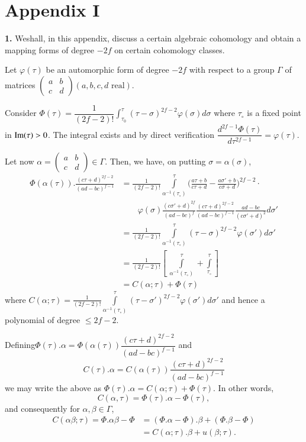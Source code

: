 \backmatter
\chapter{Appendix I}

\textbf{1.} We\pageoriginale shall, in this appendix, discuss a
certain algebraic 
cohomology and obtain a mapping forms of degree $-2f$ on certain
cohomology classes.


Let $\varphi(\tau)$ be an automorphic form of degree $-2f$ with
respect to a group $\Gamma$ of matrices $\begin{pmatrix}
  a&b\\c&d\end{pmatrix} (a,b,c,d \text{ real})$. 

Consider $\Phi (\tau)=\dfrac{1}{(2f-2)!}\int ^\tau
_{\tau_0}(\tau-\sigma)^{2f-2}\varphi (\sigma)d \sigma$ where $\tau_
\circ$ is a fixed point in $\operatorname{Im} (\tau)>0$. The integral exists and by
direct verification $\dfrac{d^{2f-1}\Phi (\tau)}{d\tau ^{2f-1}}=\varphi
(\tau)$. 

Let now $\alpha=\begin{pmatrix} a&b\\c&d\end{pmatrix}\in
\Gamma$. Then, we have, on putting $\sigma=\alpha (\sigma)$, 
\begin{align*}
  \Phi (\alpha(\tau)). \frac{(c\tau
    +d)^{2f-2}}{(ad-bc)^{f-1}}&=\frac{1}{(2f-2)!} \int
  \limits^\tau_{\alpha^{-1}(\tau_ \circ)}\bigg (\frac{a \tau+b}{c \tau
    +d}-\frac{a \sigma' +b}{c \sigma +d} \bigg )^{2f-2}\cdot \\ 
  & \qquad \varphi
  (\sigma)\frac{(c \sigma' +d)^{2f}}{(ad-bc)^f} \frac{(c \tau
    +d)^{2f-2}}{(ad-bc)^{f-1}} \frac{ad-bc}{(c \sigma' +d)^2}d
  \sigma'\\ 
  &=\frac{1}{(2f-2)!}\int \limits^\tau_{\alpha^{-1}(\tau_ \circ)}
  (\tau -\sigma)^{2f-2}\varphi (\sigma')d \sigma'\\ 
  &=\frac{1}{(2f-2)!}\left[~\int \limits^\tau_{\alpha^{-1}(\tau_ \circ)}+
    \int \limits^ \tau_{\tau_ \circ}\right]\\ 
  &=C(\alpha; \tau)+\Phi (\tau)
\end{align*}
where $C(\alpha ; \tau)=\frac{1}{(2f-2)!} \int \limits^
\tau_{\alpha^{-1}(\tau_ \circ)}(\tau -\sigma')^{2f-2}\varphi (\sigma')d
\sigma'$ and hence a polynomial of degree $\leq 2f-2$. 

Defining\pageoriginale \quad $\Phi (\tau). \alpha = \Phi(\alpha(\tau))\dfrac{(c
  \tau+d)^{2f-2}}{(ad-bc)^{f-1}}$ and  
\begin{equation}
  C(\tau).\alpha=C(\alpha(\tau))\frac{(c \tau+d)^{2f-2}}{(ad-bc)^{f-1}} \tag{*}
\end{equation}
we may write the above as
$\Phi(\tau).\alpha=C(\alpha;\tau)+\Phi(\tau)$. In other words, 
$$
C(\alpha, \tau)= \Phi (\tau). \alpha-\Phi(\tau),
$$
and consequently for $\alpha, \beta \in \Gamma$,
\begin{align*}
  C(\alpha \beta; \tau)= \Phi.\alpha \beta -\Phi
  &=(\Phi. \alpha-\Phi). \beta +(\Phi.\beta-\Phi)\\ 
  &=C(\alpha; \tau).\beta +u (\beta; \tau ).
\end{align*}


